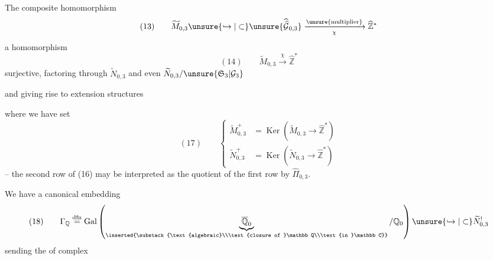 The composite homomorphism
\[
(13)\qquad \widetilde M_{0,3}\unsure{\hookrightarrow|\subset}
\unsure{\widehat{\widehat{\mathcal G}}_{0,3}}
\xrightarrow[\chi]{\text{\unsure{multiplier}}}
\widehat{\mathbb Z}^{*}
\]
 a homomorphism
\[
(14)\qquad \widetilde M_{0,3}\xrightarrow{\chi}\widehat{\mathbb Z}^{*}
\]
surjective, factoring through $\widetilde N_{0,3}$ and even  $\widetilde N_{0,3}/\unsure{\mathfrak S_3|\mathcal G_3}$


and giving rise to extension structures


where we have set
\[
(17)\qquad
\left\{\begin{aligned}
\widetilde M_{0,3}^{+}&=\operatorname{Ker}(\widetilde M_{0,3}\to\widehat{\mathbb Z}^{*})\\
\widetilde N_{0,3}^{+}&=\operatorname{Ker}(\widetilde N_{0,3}\to\widehat{\mathbb Z}^{*})
\end{aligned}\right.
\]
-- the second row of (16) may be interpreted as the quotient of the first row by $\widehat\Pi_{0,3}$.

We have a canonical embedding
\[
(18)\qquad
\Gamma_{\mathbb Q}\overset{\mathrm{dfn}}{=}
\operatorname{Gal}\left(
\underbrace{\overline{\mathbb Q}_0}_{\inserted{\substack{\text{algebraic}\\\text{closure of }\mathbb Q\\\text{in }\mathbb C}}}
/\mathbb Q_0\right)
\unsure{\hookrightarrow|\subset}\widetilde N_{0,3}^{!}
\]
sending the  of complex

